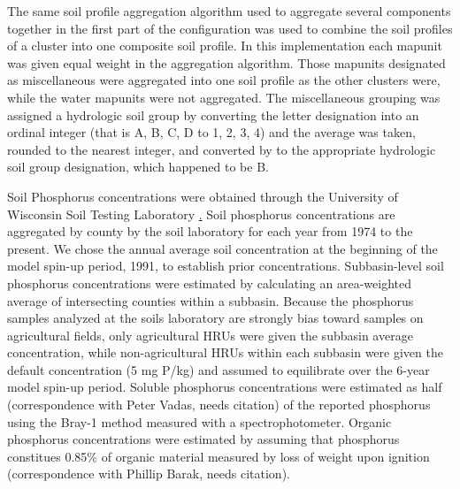The same soil profile aggregation algorithm \citep{beaudette_aqp_2013} used to aggregate several components together in the first part of the configuration was used to combine the soil profiles of a cluster into one composite soil profile. In this implementation each mapunit was given equal weight in the aggregation algorithm. Those mapunits designated as miscellaneous were aggregated into one soil profile as the other clusters were, while the water mapunits were not aggregated. The miscellaneous  grouping was assigned a hydrologic soil group by converting the letter designation into an ordinal integer (that is A, B, C, D to 1, 2, 3, 4) and the average was taken, rounded to the nearest integer, and converted by to the appropriate hydrologic soil group designation, which happened to be B. 

Soil Phosphorus concentrations were obtained through the University of Wisconsin Soil Testing Laboratory \href{http://uwlab.soils.wisc.edu/}. Soil phosphorus concentrations are aggregated by county by the soil laboratory for each year from 1974 to the present. We chose the annual average soil concentration at the beginning of the model spin-up period, 1991, to establish prior concentrations. Subbasin-level soil phosphorus concentrations were estimated by calculating an area-weighted average of intersecting counties within a subbasin. Because the phosphorus samples analyzed at the soils laboratory are strongly bias toward samples on agricultural fields, only agricultural HRUs were given the subbasin average concentration, while non-agricultural HRUs within each subbasin were given the default concentration (5 mg P/kg) and assumed to equilibrate over the 6-year model spin-up period. Soluble phosphorus concentrations were estimated as half (correspondence with Peter Vadas, needs citation) of the reported phosphorus using the Bray-1 method measured with a spectrophotometer. Organic phosphorus concentrations were estimated by assuming that phosphorus constitues 0.85\% of organic material measured by loss of weight upon ignition (correspondence with Phillip Barak, needs citation).

